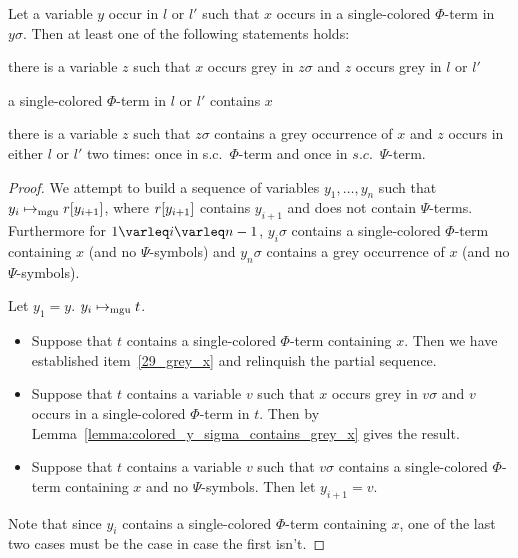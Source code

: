 \documentclass[,%
	draft=false,%
	numbers=noendperiod
	11pt,
	a4paper,
	oneside,%
	openany,
]{memoir}
\begin{document}
\begin{lemma}
	\label{lemma:y_sigma_contains_colored_x}
	Let a variable $y$ occur in $l$ or $l'$ such that $x$ occurs in a single-colored $\Phi$-term in $y\sigma$.
	Then at least one of the following statements holds:
	\begin{compactenum}
	\item 
		there is a variable $z$ such that $x$ occurs grey in $z\sigma$ and $z$ occurs grey in $l$ or $l'$
	\item
		a single-colored $\Phi$-term in $l$ or $l'$ contains $x$
		\label{29_grey_x}
	\item
		there is a variable $z$ such that $z\sigma$ contains a grey occurrence of $x$ and $z$ occurs in either $l$ or $l'$ two times: once in s.c.\ $\Phi$-term and once in $s.c.$\ $\Psi$-term.
	\end{compactenum}
\end{lemma}
\begin{proof}


	We attempt to build a sequence of variables $y_1, \dots, y_n$ such that $y_i\mapsto_{\operatorname{mgu}} r[y_{i+1}]$, where $r[y_{i+1}]$ contains $y_{i+1}$ and does not contain $\Psi$-terms.
	Furthermore for $1\varleq i \varleq n-1$, $y_i\sigma$ contains a single-colored $\Phi$-term containing $x$ (and no $\Psi$-symbols) and $y_n\sigma$ contains a grey occurrence of $x$ (and no $\Psi$-symbols).

	Let $y_1 = y$.
	$y_i \mapsto_{\operatorname{mgu}} t$.
	\begin{itemize}
		\item
			Suppose that $t$ contains a single-colored $\Phi$-term containing $x$.
			Then we have established item~\ref{29_grey_x} and relinquish the partial sequence.

		\item
			Suppose that $t$ contains a variable $v$ such that $x$ occurs grey in $v\sigma$ and $v$ occurs in a single-colored $\Phi$-term in $t$. 
			Then by Lemma~\ref{lemma:colored_y_sigma_contains_grey_x} gives the result.

		\item
			Suppose that $t$ contains a variable $v$ such that $v\sigma$ contains a single-colored $\Phi$-term containing $x$ and no $\Psi$-symbols. Then let $y_{i+1} = v$.
	\end{itemize}
	Note that since $y_i$ contains a single-colored $\Phi$-term containing $x$, one of the last two cases must be the case in case the first isn't.

\end{proof}
\end{document}
